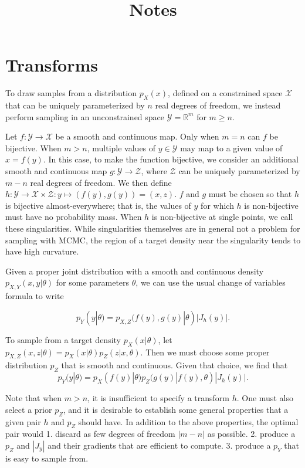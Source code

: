 \documentclass[11pt]{article}
\begin{document}
\title{Notes}

\section{Transforms}

To draw samples from a distribution $p_X(x)$, defined on a constrained space $\mathcal{X}$ that can be uniquely parameterized by $n$ real degrees of freedom, we instead perform sampling in an unconstrained space $\mathcal{Y}=\mathbb{R}^m$ for $m \ge n$.

Let $f\colon \mathcal{Y} \to \mathcal{X}$ be a smooth and continuous map.
Only when $m = n$ can $f$ be bijective.
When $m > n$, multiple values of $y \in \mathcal{Y}$ may map to a given value of $x = f(y)$.
In this case, to make the function bijective, we consider an additional smooth and continuous map $g\colon \mathcal{Y} \to \mathcal{Z}$, where $\mathcal{Z}$ can be uniquely parameterized by $m - n$ real degrees of freedom.
We then define $h\colon \mathcal{Y} \to \mathcal{X} \times \mathcal{Z}: y \mapsto (f(y), g(y)) = (x, z)$.
$f$ and $g$ must be chosen so that $h$ is bijective almost-everywhere;
that is, the values of $y$ for which $h$ is non-bijective must have no probability mass.
When $h$ is non-bijective at single points, we call these singularities.
While singularities themselves are in general not a problem for sampling with MCMC, the region of a target density near the singularity tends to have high curvature.

Given a proper joint distribution with a smooth and continuous density $p_{X,Y}(x, y | \theta)$ for some parameters $\theta$, we can use the usual change of variables formula to write

\[
  p_Y(y | \theta) = p_{X,Z}(f(y), g(y) | \theta) |J_h(y)|.
\]

To sample from a target density $p_X(x | \theta)$, let $p_{X,Z}(x, z | \theta) = p_X(x | \theta) p_Z(z | x, \theta)$.
Then we must choose some proper distribution $p_Z$ that is smooth and continuous.
Given that choice, we find that
\[
  p_Y(y | \theta) = p_X(f(y) | \theta) p_Z(g(y) | f(y), \theta) |J_h(y)|.
\]

Note that when $m > n$, it is insufficient to specify a transform $h$.
One must also select a prior $p_Z$, and it is desirable to establish some general properties that a given pair $h$ and $p_Z$ should have.
In addition to the above properties, the optimal pair would
1. discard as few degrees of freedom $|m - n|$ as possible.
2. produce a $p_Z$ and $|J_y|$ and their gradients that are efficient to compute.
3. produce a $p_Y$ that is easy to sample from.
\end{document}

